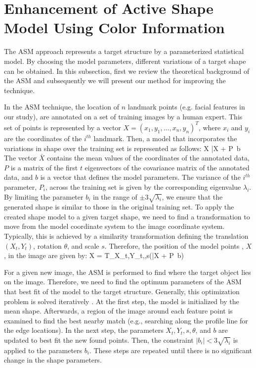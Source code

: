 \chapter{Enhancement of Active Shape Model Using Color Information}
\label{colorModeling} The ASM approach represents a target structure
by a parameterized statistical model. By choosing the model
parameters, different variations of a target shape can be obtained.
In this subsection, first we review the theoretical background of
the ASM and subsequently we will present our method for improving
the technique.

In the ASM technique, the location of $n$ landmark points (e.g.
facial features in our study), are annotated on a set of training
images by a human expert. This set of points is represented by a
vector $X = (x_1,y_1, \dots, x_n,y_n)^T$, where $x_i$ and $y_i$ are
the coordinates of the $i^{th}$ landmark. Then, a model that
incorporates the variations in shape over the training set is
represented as follows: \beq X \approx \bar{X} + P~b \eeq The vector
$\bar{X}$ contains the mean values of the coordinates of the
annotated data, $P$ is a matrix of the first $t$ eigenvectors of the
covariance matrix of the annotated data, and $b$ is a vector that
defines the model parameters. The variance of the $i^{th}$
parameter, $P_i$, across the training set is given by the
corresponding eigenvalue $\lambda_i$. By limiting the parameter
$b_i$ in the range of $\pm3\sqrt{\lambda_i}$, we ensure that the
generated shape is similar to those in the original training set. To
apply the created shape model to a given target shape, we need to
find a transformation to move from the model coordinate system to
the image coordinate system. Typically, this is achieved by a
similarity transformation defining the translation $(X_t, Y_t)$,
rotation $\theta$, and scale $s$. Therefore, the position of the
model points , $X$, in the image are given by: \beq X =
T_{X_t,Y_t,\theta,s}(\bar{X} + P~b) \eeq

For a given new image, the ASM is performed to find where the target
object lies on the image. Therefore, we need to find the optimum
parameters of the ASM that best fit of the model to the target
structure. Generally, this optimization problem is solved
iteratively \cite{Cootes_1}. At the first step, the model is
initialized by the mean shape. Afterwards, a region of the image
around each feature point is examined to find the best nearby match
(e.g., searching along the profile line for the edge locations). In
the next step, the parameters $X_t, Y_t, s, \theta$, and $b$ are
updated to best fit the new found points. Then, the constraint
$|b_i| < 3\sqrt{\lambda_i}$ is applied to the parameters $b_i$.
These steps are repeated until there is no significant change in the
shape parameters.

